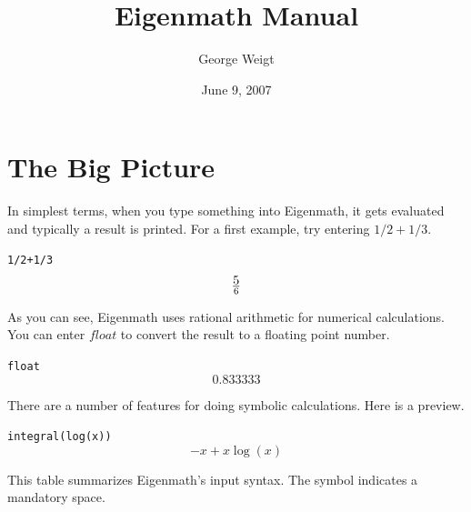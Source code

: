 \documentclass[12pt]{book}
\title{Eigenmath Manual}
\author{George Weigt}
\date{June 9, 2007}
\begin{document}
\maketitle
\tableofcontents

\newpage

\chapter{The Big Picture}
In simplest terms, when you type something into Eigenmath,
it gets evaluated and typically a result is printed.
For a first example, try entering $1/2+1/3$.

\medskip
\verb$1/2+1/3$
$$5\over6$$

\medskip
\noindent
As you can see, Eigenmath uses rational arithmetic for numerical calculations.
You can enter $float$ to convert the result to a floating point number.

\medskip
\verb$float$
$$0.833333$$

\medskip
\noindent
There are a number of features for doing symbolic calculations.
Here is a preview.

\medskip
\verb$integral(log(x))$
$$-x+x\log(x)$$

\newpage

\noindent
This table summarizes Eigenmath's input syntax.
The symbol {\tt{}} indicates a mandatory space.
\end{document}
